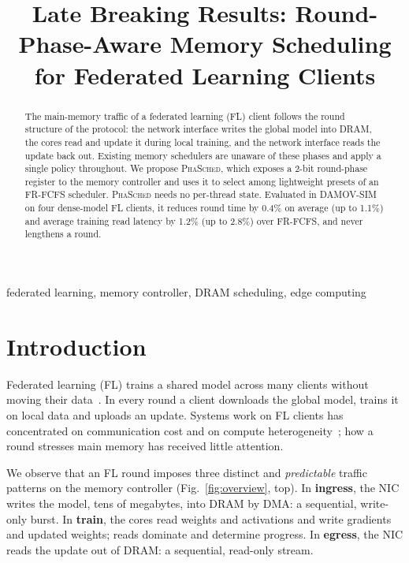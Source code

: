 \documentclass[conference]{IEEEtran}
\newcommand{\name}{\textsc{PhaSched}}
\begin{document}
\title{Late Breaking Results: Round-Phase-Aware Memory Scheduling for Federated Learning Clients}

\author{
}

\maketitle

\begin{abstract}
The main-memory traffic of a federated learning (FL) client follows the round structure of the protocol: the network interface writes the global model into DRAM, the cores read and update it during local training, and the network interface reads the update back out. Existing memory schedulers are unaware of these phases and apply a single policy throughout. We propose \name{}, which exposes a 2-bit round-phase register to the memory controller and uses it to select among lightweight presets of an FR-FCFS scheduler. \name{} needs no per-thread state. Evaluated in DAMOV-SIM on four dense-model FL clients, it reduces round time by 0.4\% on average (up to 1.1\%) and average training read latency by 1.2\% (up to 2.8\%) over FR-FCFS, and never lengthens a round.
\end{abstract}

\begin{IEEEkeywords}
federated learning, memory controller, DRAM scheduling, edge computing
\end{IEEEkeywords}

\section{Introduction}
Federated learning (FL) trains a shared model across many clients without moving their data~\cite{fedavg}. In every round a client downloads the global model, trains it on local data and uploads an update. Systems work on FL clients has concentrated on communication cost and on compute heterogeneity~\cite{flscale,flopen}; how a round stresses main memory has received little attention.

We observe that an FL round imposes three distinct and \emph{predictable} traffic patterns on the memory controller (Fig.~\ref{fig:overview}, top). In \textbf{ingress}, the NIC writes the model, tens of megabytes, into DRAM by DMA: a sequential, write-only burst. In \textbf{train}, the cores read weights and activations and write gradients and updated weights; reads dominate and determine progress. In \textbf{egress}, the NIC reads the update out of DRAM: a sequential, read-only stream.
\end{document}
